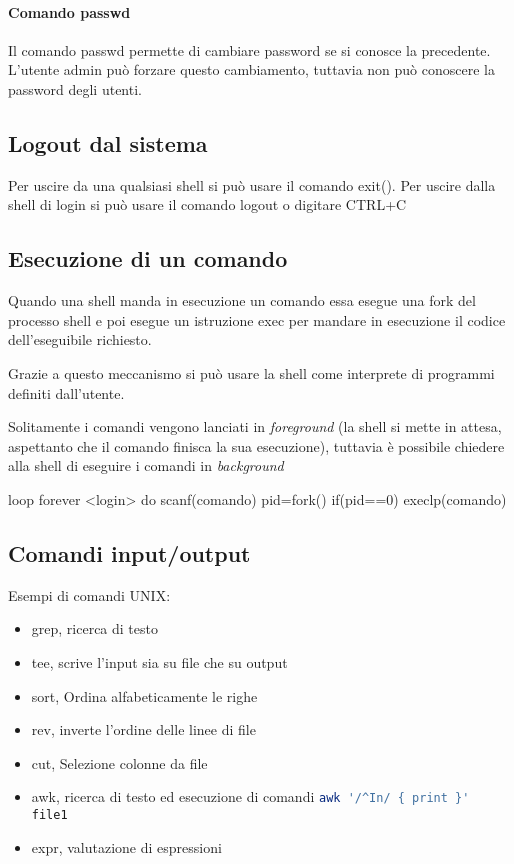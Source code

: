 \documentclass
[10pt,        %
 a4paper,     %
 onecolumn,   %
 fleqn,       %
 oneside,     %
 notitlepage, %
 openany      %
]{article}    %
\begin{document}
\paragraph{Comando passwd}
Il comando passwd permette di cambiare password se si conosce la precedente. L'utente admin può forzare questo cambiamento, tuttavia non può conoscere la password degli utenti.

\subsection{Logout dal sistema}
Per uscire da una qualsiasi shell si può usare il comando exit(). Per uscire dalla shell di login si può usare il comando logout o digitare CTRL+C

\subsection{Esecuzione di un comando}
Quando una shell manda in esecuzione un comando essa esegue una fork del processo shell e poi esegue un istruzione exec per mandare in esecuzione il codice dell'eseguibile richiesto.


Grazie a questo meccanismo si può usare la shell come interprete di programmi definiti dall'utente. 

Solitamente i comandi vengono lanciati in \textit{foreground} (la shell si mette in attesa, aspettanto che il comando finisca la sua esecuzione), tuttavia è possibile chiedere alla shell di eseguire i comandi in \textit{background}

\begin{C}
loop forever
<login>
do{
    scanf(comando)
    pid=fork()
    if(pid==0)
     execlp(comando)
}
\end{C}

\subsection{Comandi input/output}
Esempi di comandi UNIX:
\begin{itemize}
    \item grep, ricerca di testo
    \item tee, scrive l'input sia su file che su output
    \item sort, Ordina alfabeticamente le righe
    \item rev, inverte l'ordine delle linee di file
    \item cut, Selezione colonne da file
    \item awk, ricerca di testo ed esecuzione di comandi \lstinline[language=bash]!awk '/^In/ { print }' file1!
    \item expr, valutazione di espressioni 
\end{itemize}
\end{document}

